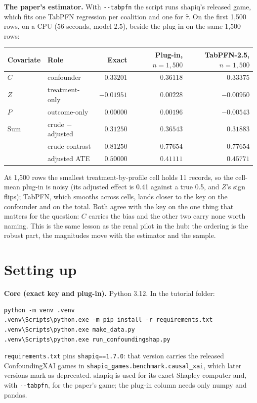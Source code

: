 \documentclass[10pt,letterpaper]{article}
\begin{document}
\textbf{The paper's estimator.} With \texttt{-{}-tabpfn} the script runs shapiq's released game, which fits one TabPFN regression per coalition and one for $\hat\tau$. On the first 1,500 rows, on a CPU (56 seconds, model 2.5), beside the plug-in on the same 1,500 rows:
\begin{center}
\begin{tabular}{@{}llrrr@{}}
\toprule Covariate & Role & Exact & Plug-in, $n=1{,}500$ & TabPFN-2.5, $n=1{,}500$\\\midrule
$C$ & confounder & $0.33201$ & $0.36118$ & $0.33375$\\
$Z$ & treatment-only & $-0.01951$ & $0.00228$ & $-0.00950$\\
$P$ & outcome-only & $0.00000$ & $0.00196$ & $-0.00543$\\
\midrule Sum & crude $-$ adjusted & $0.31250$ & $0.36543$ & $0.31883$\\
& crude contrast & $0.81250$ & $0.77654$ & $0.77654$\\
& adjusted ATE & $0.50000$ & $0.41111$ & $0.45771$\\
\bottomrule
\end{tabular}
\end{center}
At 1,500 rows the smallest treatment-by-profile cell holds 11 records, so the cell-mean plug-in is noisy (its adjusted effect is 0.41 against a true 0.5, and $Z$'s sign flips); TabPFN, which smooths across cells, lands closer to the key on the confounder and on the total. Both agree with the key on the one thing that matters for the question: $C$ carries the bias and the other two carry none worth naming. This is the same lesson as the renal pilot in the hub: the ordering is the robust part, the magnitudes move with the estimator and the sample.

\newpage
\section{Setting up}
\textbf{Core (exact key and plug-in).} Python 3.12. In the tutorial folder:
\begin{verbatim}
python -m venv .venv
.venv\Scripts\python.exe -m pip install -r requirements.txt
.venv\Scripts\python.exe make_data.py
.venv\Scripts\python.exe run_confoundingshap.py
\end{verbatim}
\texttt{requirements.txt} pins \texttt{shapiq==1.7.0}: that version carries the released ConfoundingXAI games in \texttt{shapiq\_games.benchmark.causal\_xai}, which later versions mark as deprecated. shapiq is used for its exact Shapley computer and, with \texttt{-{}-tabpfn}, for the paper's game; the plug-in column needs only numpy and pandas.
\end{document}
